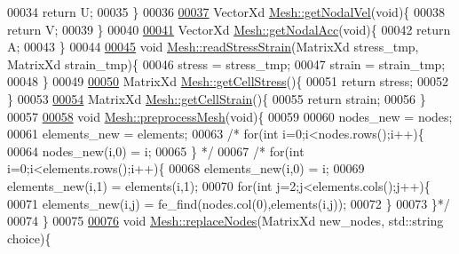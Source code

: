 \begin{DoxyCode}
00034     \textcolor{keywordflow}{return} U;
00035 \}
00036 
\hyperlink{class_mesh_a052cd330cb8ccecf63e960a7afd0a6d9}{00037} VectorXd \hyperlink{class_mesh_a052cd330cb8ccecf63e960a7afd0a6d9}{Mesh::getNodalVel}(\textcolor{keywordtype}{void})\{
00038     \textcolor{keywordflow}{return} V;
00039 \}
00040 
\hyperlink{class_mesh_ad41670edd4e6335071012837a58fb725}{00041} VectorXd \hyperlink{class_mesh_ad41670edd4e6335071012837a58fb725}{Mesh::getNodalAcc}(\textcolor{keywordtype}{void})\{
00042     \textcolor{keywordflow}{return} A;
00043 \}
00044 
\hyperlink{class_mesh_a2c1456f1b3b5bda8d213624e3943dbb3}{00045} \textcolor{keywordtype}{void} \hyperlink{class_mesh_a2c1456f1b3b5bda8d213624e3943dbb3}{Mesh::readStressStrain}(MatrixXd stress\_tmp, MatrixXd strain\_tmp)\{
00046     stress = stress\_tmp;
00047     strain = strain\_tmp;
00048 \}
00049 
\hyperlink{class_mesh_a4ec62fd7219adcd406a167c1f6ee81e8}{00050} MatrixXd \hyperlink{class_mesh_a4ec62fd7219adcd406a167c1f6ee81e8}{Mesh::getCellStress}()\{
00051     \textcolor{keywordflow}{return} stress;
00052 \}
00053 
\hyperlink{class_mesh_a1c54802401d00d14b390db2f0e615ebb}{00054} MatrixXd \hyperlink{class_mesh_a1c54802401d00d14b390db2f0e615ebb}{Mesh::getCellStrain}()\{
00055     \textcolor{keywordflow}{return} strain;
00056 \}
00057 
\hyperlink{class_mesh_aa8a6f260e9589be4c0a2fcc146e696d5}{00058} \textcolor{keywordtype}{void} \hyperlink{class_mesh_aa8a6f260e9589be4c0a2fcc146e696d5}{Mesh::preprocessMesh}(\textcolor{keywordtype}{void})\{
00059 
00060     nodes\_new = nodes;
00061     elements\_new = elements;
00063     \textcolor{comment}{/* for(int i=0;i<nodes.rows();i++)\{}
00064 \textcolor{comment}{        nodes\_new(i,0) = i;}
00065 \textcolor{comment}{    \} */}
00067     \textcolor{comment}{/* for(int i=0;i<elements.rows();i++)\{}
00068 \textcolor{comment}{        elements\_new(i,0) = i;}
00069 \textcolor{comment}{        elements\_new(i,1) = elements(i,1);}
00070 \textcolor{comment}{        for(int j=2;j<elements.cols();j++)\{}
00071 \textcolor{comment}{            elements\_new(i,j) = fe\_find(nodes.col(0),elements(i,j));}
00072 \textcolor{comment}{        \}}
00073 \textcolor{comment}{    \}*/}
00074 \}
00075 
\hyperlink{class_mesh_af03b49cbaf762652c9ff5ff7f4a6e668}{00076} \textcolor{keywordtype}{void} \hyperlink{class_mesh_af03b49cbaf762652c9ff5ff7f4a6e668}{Mesh::replaceNodes}(MatrixXd new\_nodes, std::string choice)\{

\end{DoxyCode}
